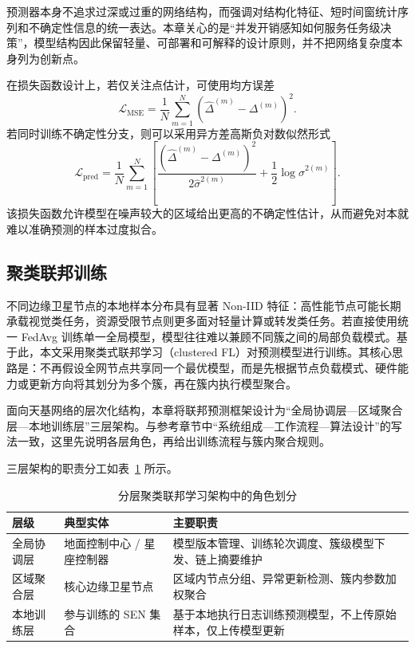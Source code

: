 预测器本身不追求过深或过重的网络结构，而强调对结构化特征、短时间窗统计序列和不确定性信息的统一表达。本章关心的是“并发开销感知如何服务任务级决策”，模型结构因此保留轻量、可部署和可解释的设计原则，并不把网络复杂度本身列为创新点。

在损失函数设计上，若仅关注点估计，可使用均方误差
\begin{equation}
    \mathcal{L}_{\mathrm{MSE}} = \frac{1}{N}\sum_{m=1}^{N}
    \left( \widehat{\Delta}^{(m)} - \Delta^{(m)} \right)^2.
    \label{eq:ch5_mse_loss}
\end{equation}
若同时训练不确定性分支，则可以采用异方差高斯负对数似然形式
\begin{equation}
    \mathcal{L}_{\mathrm{pred}}
    =
    \frac{1}{N}
    \sum_{m=1}^{N}
    \left[
        \frac{\left(\widehat{\Delta}^{(m)}-\Delta^{(m)}\right)^2}{2\widehat{\sigma}^{2(m)}}
        +
        \frac{1}{2}\log \widehat{\sigma}^{2(m)}
        \right].
    \label{eq:ch5_hetero_loss}
\end{equation}
该损失函数允许模型在噪声较大的区域给出更高的不确定性估计，从而避免对本就难以准确预测的样本过度拟合。

\subsection{聚类联邦训练}

不同边缘卫星节点的本地样本分布具有显著 Non-IID 特征：高性能节点可能长期承载视觉类任务，资源受限节点则更多面对轻量计算或转发类任务。若直接使用统一 FedAvg 训练单一全局模型，模型往往难以兼顾不同簇之间的局部负载模式。基于此，本文采用聚类式联邦学习（clustered FL）对预测模型进行训练。其核心思路是：不再假设全网节点共享同一个最优模型，而是先根据节点负载模式、硬件能力或更新方向将其划分为多个簇，再在簇内执行模型聚合。

面向天基网络的层次化结构，本章将联邦预测框架设计为“全局协调层—区域聚合层—本地训练层”三层架构。与参考章节中“系统组成—工作流程—算法设计”的写法一致，这里先说明各层角色，再给出训练流程与簇内聚合规则。

三层架构的职责分工如表~\ref{tab:ch5_fl_roles} 所示。

\begin{table}[H]
    \centering
    \caption{分层聚类联邦学习架构中的角色划分}
    \label{tab:ch5_fl_roles}
    \begin{tabular}{p{2.7cm}p{3.0cm}p{6.0cm}}
        \toprule
        层级    & 典型实体           & 主要职责                           \\
        \midrule
        全局协调层 & 地面控制中心 / 星座控制器 & 模型版本管理、训练轮次调度、簇级模型下发、链上摘要维护    \\
        区域聚合层 & 核心边缘卫星节点       & 区域内节点分组、异常更新检测、簇内参数加权聚合        \\
        本地训练层 & 参与训练的 SEN 集合   & 基于本地执行日志训练预测模型，不上传原始样本，仅上传模型更新 \\
        \bottomrule
    \end{tabular}
\end{table}

